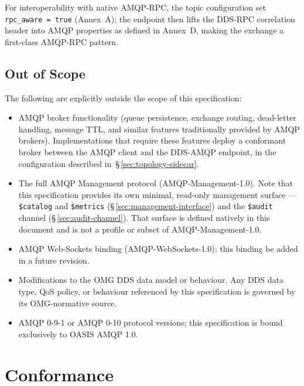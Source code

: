\documentclass{../styles/zerodds-vendor-spec}
\begin{document}
For interoperability with native AMQP-RPC, the topic
configuration  set \texttt{rpc\_aware = true}
(Annex~A); the endpoint then lifts the DDS-RPC correlation
header into AMQP properties as defined in Annex~D, making the
exchange a first-class AMQP-RPC pattern.

\section{Out of Scope}\label{sec:out-of-scope}

The following are explicitly outside the scope of this specification:

\begin{itemize}
  \item AMQP broker functionality (queue persistence, exchange
        routing, dead-letter handling, message TTL, and similar
        features traditionally provided by AMQP brokers).
        Implementations that require these features 
        deploy a conformant broker between the AMQP client and the
        DDS-AMQP endpoint, in the configuration described
        in~\S\,\ref{sec:topology-sidecar}.
  \item The full AMQP Management protocol (AMQP-Management-1.0).
        Note that this specification provides its own minimal,
        read-only management surface — \texttt{\$catalog} and
        \texttt{\$metrics} (\S\,\ref{sec:management-interface})
        and the \texttt{\$audit} channel
        (\S\,\ref{sec:audit-channel}). That surface is defined
        natively in this document and is not a profile or subset
        of AMQP-Management-1.0.
  \item AMQP Web-Sockets binding (AMQP-WebSockets-1.0); this binding
         be added in a future revision.
  \item Modifications to the OMG DDS data model or behaviour. Any
        DDS data type, QoS policy, or behaviour referenced by this
        specification is governed by its OMG-normative source.
  \item AMQP 0-9-1 or AMQP 0-10 protocol versions; this specification
        is bound exclusively to OASIS AMQP 1.0.
\end{itemize}

\chapter{Conformance}\label{ch:conformance}
\end{document}
